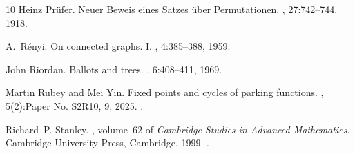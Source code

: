 \documentclass[letterpaper]{amsart}
\theoremstyle{plain}
\theoremstyle{definition}
\theoremstyle{remark}
\begin{document}
\begin{thebibliography}{10}
Heinz Pr{\"u}fer.
\newblock Neuer {B}eweis eines {S}atzes {\"u}ber {P}ermutationen.
, 27:742--744, 1918.

A.~R\'enyi.
\newblock On connected graphs. {I}.
, 4:385--388, 1959.

John Riordan.
\newblock Ballots and trees.
, 6:408--411, 1969.

Martin Rubey and Mei Yin.
\newblock Fixed points and cycles of parking functions.
, 5(2):Paper No. S2R10, 9, 2025.
\newblock \href {https://doi.org/10.54550/eca2025v5s2r10} {}.

Richard~P. Stanley.
, volume~62 of {\em Cambridge Studies in Advanced Mathematics}.
\newblock Cambridge University Press, Cambridge, 1999.
\newblock \href {https://doi.org/10.1017/CBO9780511609589} {}.

\end{thebibliography}
\end{document}
